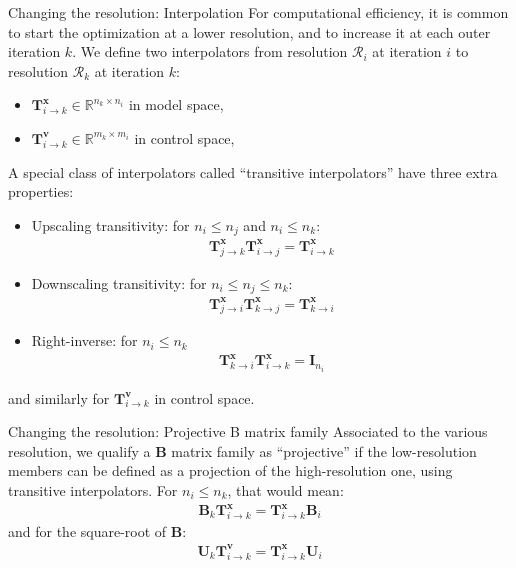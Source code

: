 \documentclass[10pt]{beamer}
\begin{document}
\begin{frame}{Changing the resolution: Interpolation}
For computational efficiency, it is common to start the optimization at a lower resolution, and to increase it at each outer iteration $k$. We define two interpolators from resolution $\mathcal{R}_i$ at iteration $i$ to resolution $\mathcal{R}_k$ at iteration $k$:
\begin{itemize}
\item $\mathbf{T}^\mathbf{x}_{i \rightarrow k} \in \mathbb{R}^{n_k \times n_i}$ in model space,
\item $\mathbf{T}^\mathbf{v}_{i \rightarrow k} \in \mathbb{R}^{m_k \times m_i}$ in control space,
\end{itemize}
$  $\\
A special class of interpolators called ``transitive interpolators'' have three extra properties:
\begin{itemize}
\item Upscaling transitivity: for $n_i \le n_j$ and $n_i \le n_k$:
\begin{align}
\mathbf{T}^\mathbf{x}_{j \rightarrow k} \mathbf{T}^\mathbf{x}_{i \rightarrow j} = \mathbf{T}^\mathbf{x}_{i \rightarrow k}
\end{align}
\item Downscaling transitivity: for $n_i \le n_j \le n_k$:
\begin{align}
\mathbf{T}^\mathbf{x}_{j \rightarrow i} \mathbf{T}^\mathbf{x}_{k \rightarrow j} = \mathbf{T}^\mathbf{x}_{k \rightarrow i}
\end{align}
\item Right-inverse: for $n_i \le n_k$
\begin{align}
\mathbf{T}^\mathbf{x}_{k \rightarrow i} \mathbf{T}^\mathbf{x}_{i \rightarrow k} = \mathbf{I}_{n_i}
\end{align}
\end{itemize}
and similarly for $\mathbf{T}^\mathbf{v}_{i \rightarrow k}$ in control space.
\end{frame}

\begin{frame}{Changing the resolution: Projective B matrix family}
Associated to the various resolution, we qualify a $\mathbf{B}$ matrix family as ``projective'' if the low-resolution members can be defined as a projection of the high-resolution one, using transitive interpolators. For $n_i \le n_k$, that would mean:
\begin{align}
\label{eq:projective_definition_B}
\mathbf{B}_k \mathbf{T}^\mathbf{x}_{i \rightarrow k} = \mathbf{T}^\mathbf{x}_{i \rightarrow k} \mathbf{B}_i
\end{align}
and for the square-root of $\mathbf{B}$:
\begin{align}
\label{eq:projective_definition_U}
\mathbf{U}_k \mathbf{T}^\mathbf{v}_{i \rightarrow k} = \mathbf{T}^\mathbf{x}_{i \rightarrow k} \mathbf{U}_i
\end{align}
\end{frame}
\end{document}
